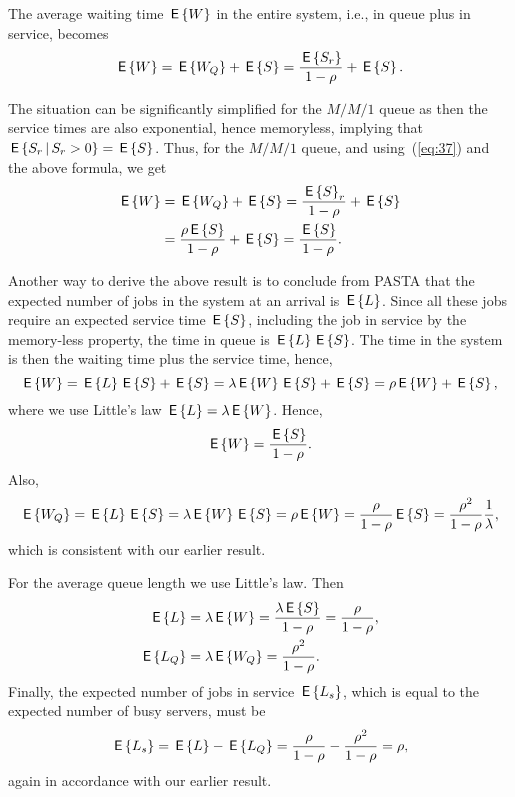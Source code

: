 The average waiting time $\E W$ in the entire system, i.e., in queue
plus in service, becomes
\begin{equation*}
  \E W = \E{W_Q}+ \E S = \frac{\E{S_r}}{1-\rho} + \E S.
\end{equation*}

The situation can be significantly simplified for the $M/M/1$ queue as
then the service times are also exponential, hence memoryless,
implying that $\E{S_r\given S_r>0} = \E S$. Thus, for the $M/M/1$ queue, 
and using~(\ref{eq:37}) and the above formula, we get 
\begin{equation*}
  \begin{split}
  \E W 
&= \E{W_Q}+ \E S = 
\frac{\E S_r}{1-\rho} + \E S \\
&= \frac{\rho \E S}{1-\rho} + \E S = \frac{\E S}{1-\rho}.
  \end{split}
\end{equation*}

Another way to derive the above result is to conclude from PASTA that
the expected number of jobs in the system at an arrival is $\E{L}$.
Since all these jobs require an expected service time $\E S$,
including the job in service by the memory-less property, the time in
queue is $\E L \E S$. The time in the system is then the waiting time
plus the service time, hence,
\begin{equation}\label{eq:61}
  \E W = \E L  \E S + \E S = \lambda \E W \E S + \E S = \rho \E W  + \E S,
\end{equation}
where we use Little's law $\E L = \lambda \E W$.  Hence,
\begin{equation*}
\E W = \frac{\E S}{1-\rho}.
\end{equation*}
Also,
\begin{equation}\label{eq:wqes}
  \E{W_Q} = \E L \E S = \lambda \E W \E S= \rho \E W = \frac{\rho}{1-\rho} \E S = \frac{\rho^2}{1-\rho} \frac 1 \lambda,
\end{equation}
which is consistent with our earlier result.  

For the average queue length we use Little's law. Then
\begin{equation*}
  \begin{split}
\E L &= \lambda \E W = \frac{\lambda \E S}{1-\rho} = \frac\rho{1-\rho}, \\
  \E{L_Q} &= \lambda \E{W_Q} = \frac{\rho^2}{1-\rho}.
      \end{split}
\end{equation*}
Finally, the expected number of jobs in service $\E{L_s}$, which is
equal to the expected number of busy servers, must be
\begin{equation*}
  \E{L_s} = \E L - \E{L_Q} = \frac{\rho}{1-\rho} - \frac{\rho^2}{1-\rho} = \rho, 
\end{equation*}
again in accordance with our earlier result.

